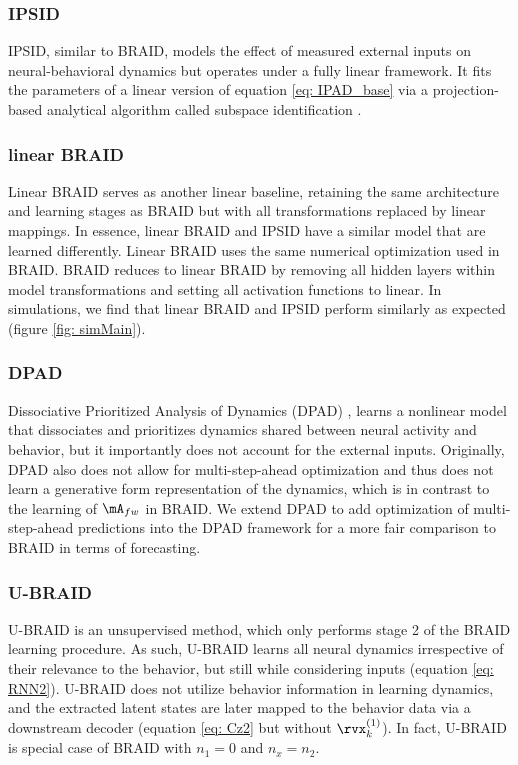 \documentclass{article} %
\newcommand{\ourmethod}{BRAID}
\newcommand{\ourmethodlinear}{linear \ourmethod}
\newcommand{\ourmethodunsup}{U-\ourmethod}
\newcommand{\Afw}{\(\mA_{fw}\)}
\begin{document}
\subsubsection{IPSID}
IPSID, similar to \ourmethod{}, models the effect of measured external inputs on neural-behavioral dynamics but operates under a fully linear framework. It fits the parameters of a linear version of equation \ref{eq: IPAD_base} via a projection-based analytical algorithm called subspace identification \citep{van_overschee_subspace_1996}. 

\subsubsection{\ourmethodlinear{}}
Linear \ourmethod{} serves as another linear baseline, retaining the same architecture and learning stages as \ourmethod{} but with all transformations replaced by linear mappings. In essence, \ourmethodlinear{} and IPSID have a similar model that are learned differently. Linear \ourmethod{} uses the same numerical optimization used in \ourmethod{}. \ourmethod{} reduces to \ourmethodlinear{} by removing all hidden layers within model transformations and setting all activation functions to linear. In simulations, we find that \ourmethodlinear{} and IPSID perform similarly as expected (figure \ref{fig: simMain}).

\subsubsection{DPAD}
Dissociative Prioritized Analysis of Dynamics (DPAD) \citep{sani2024dissociative}, learns a nonlinear model that dissociates and prioritizes dynamics shared between neural activity and behavior, but it importantly does not account for the external inputs. Originally, DPAD also does not allow for multi-step-ahead optimization and thus does not learn a generative form representation of the dynamics, which is in contrast to the learning of \Afw{} in \ourmethod{}. We extend DPAD to add optimization of multi-step-ahead predictions into the DPAD framework for a more fair comparison to \ourmethod{} in terms of forecasting.  

\subsubsection{\ourmethodunsup{}}
\ourmethodunsup{} is an unsupervised method, which only performs stage 2 of the \ourmethod{} learning procedure. As such, \ourmethodunsup{} learns all neural dynamics irrespective of their relevance to the behavior, but still while considering inputs (equation \ref{eq: RNN2}). \ourmethodunsup{} does not utilize behavior information in learning dynamics, and the extracted latent states are later mapped to the behavior data via a downstream decoder (equation \ref{eq: Cz2} but without $\rvx_k^{(1)}$). In fact, \ourmethodunsup{} is special case of \ourmethod{} with $n_1=0$ and $n_x=n_2$.
\end{document}

